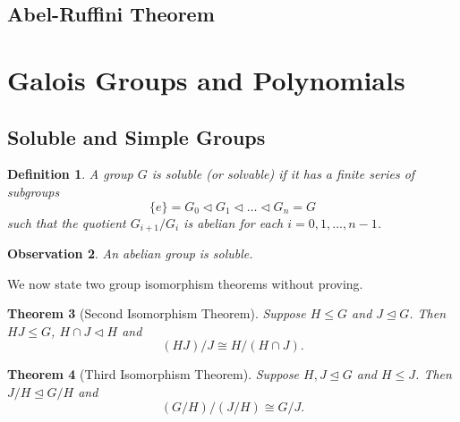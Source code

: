\documentclass[12pt]{article}
\newtheorem{theorem}{Theorem}
\newtheorem{definition}[theorem]{Definition}
\newtheorem{observation}[theorem]{\textbf{Observation}}
\begin{document}
\subsection{Abel-Ruffini Theorem}
\section{Galois Groups and Polynomials}

\subsection{Soluble and Simple Groups}

\begin{definition} \label{def:soluble}
    A group $G$ is soluble (or solvable) if it has a finite series of subgroups 
    $$ \{ e \} = G_0 \triangleleft G_1 \triangleleft \dots \triangleleft G_n = G$$
    such that the quotient $G_{i+1} / G_{i}$ is abelian for each $i = 0, 1, ...,  n - 1$.
\end{definition}

\begin{observation}
    An abelian group is soluble. 
\end{observation}

We now state two group isomorphism theorems without proving. 

\begin{theorem}[Second Isomorphism Theorem] \label{thm:second-iso}
    Suppose $H \le G$ and $J \trianglelefteq G$. Then $HJ \le G$, $H \cap J \triangleleft H$ and $$
    (HJ) / J \cong H / (H \cap J). 
    $$
\end{theorem}
\begin{theorem}[Third Isomorphism Theorem] \label{thm:third-iso}
    Suppose $H, J \trianglelefteq G$ and $H \le J$. Then $J/H \trianglelefteq G/H$ and $$
    (G/H)/(J/H) \cong G / J.    $$
\end{theorem}
\end{document}
